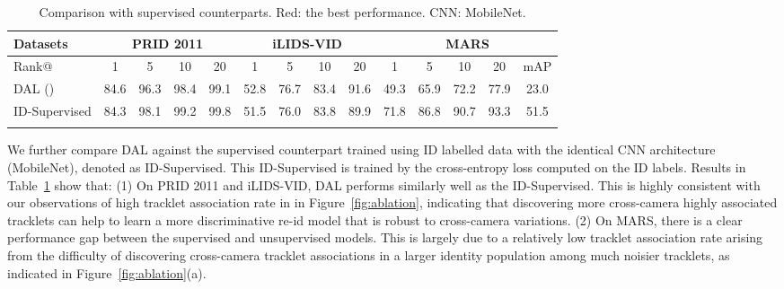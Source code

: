 \documentclass{bmvc2k}
\begin{document}
\begin{table}[!t]
	\centering
	\footnotesize
	\setlength{\tabcolsep}{0.5em}
	\begin{tabular}{l|cccc|cccc|cccc|c}
		\hlineB{2}
		Datasets & \multicolumn{4}{c|}{PRID 2011} & \multicolumn{4}{c|}{iLIDS-VID} & \multicolumn{5}{c}{MARS} \\
		\hline
		Rank@ & 1 & 5 & 10 & 20 & 1 & 5 & 10 & 20 & 1 & 5 & 10 & 20 & mAP \\ \hline\hline
DAL ()
		& 
		{\color{red} 84.6} & {96.3} & {98.4} & {99.1} &
{\color{red} 52.8} & {\color{red} 76.7} & 83.4 & {\color{red} 91.6} & 
		49.3 & 65.9 & 72.2 & 77.9 & 23.0
		\\
		ID-Supervised & 
		84.3 & {\color{red} 98.1} & {\color{red} 99.2} & {\color{red} 99.8} & 
		51.5 & 76.0 & {\color{red} 83.8} & 89.9 & 
		{\color{red} 71.8} & {\color{red} 86.8} & {\color{red} 90.7} & {\color{red} 93.3} & {\color{red} 51.5} \\
		\hlineB{2}
	\end{tabular}
	\vspace{1.0em}
	\caption{Comparison with supervised counterparts. {\color{red} Red}: the best performance. CNN: MobileNet.}
	\label{tab:counterpart}
	\vspace{-1em}
\end{table}

\vspace{0.1em}
We further compare DAL against the supervised counterpart 
trained using ID labelled data with the identical CNN
architecture (MobileNet), denoted as ID-Supervised.
This ID-Supervised is trained by the cross-entropy loss computed on
the ID labels. Results in Table~\ref{tab:counterpart} show that:
(1) On PRID 2011 and iLIDS-VID, DAL performs similarly well as 
the ID-Supervised. 
This is highly consistent with our observations of high tracklet association rate in in Figure~\ref{fig:ablation}, 
indicating that discovering more cross-camera highly associated tracklets 
can help to learn a more discriminative re-id model that is robust to cross-camera variations. 
(2) On MARS, there is a clear performance gap between
the supervised and unsupervised models.
This is largely due to a relatively low tracklet association rate arising from the difficulty of discovering
cross-camera tracklet associations in a larger identity population among much 
noisier tracklets, as indicated in Figure~\ref{fig:ablation}(a).

\vspace{-0.2cm}
\end{document}
